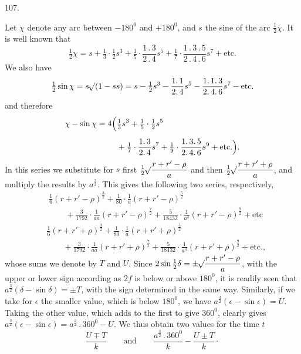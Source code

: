\par{}\medskip
{}
\begin{center}107.\end{center}
Let $\chi$ denote any arc between $-180^0$ and $+180^0$, and $s$ the sine of the arc $\tfrac12\chi$. It is well known that
\[
\tfrac12\chi=s+\tfrac13\cdot\tfrac12s^3+\tfrac15\cdot\frac{1\mathpunct{.}3}{2\mathpunct{.}4}s^5+\tfrac17\cdot\frac{1\mathpunct{.}3\mathpunct{.}5}{2\mathpunct{.}4\mathpunct{.}6}s^7+\text{etc.}
\]
\noindent We also have
\[
\tfrac12\sin\chi=s\mathord{{}^{}\!\surd}(1-ss)=s-\tfrac12s^3-\frac{1\mathpunct{.}1}{2\mathpunct{.}4}s^5-\frac{1\mathpunct{.}1\mathpunct{.}3}{2\mathpunct{.}4\mathpunct{.}6}s^7-\text{etc.}
\]
\noindent and therefore
\[
\begin{aligned}
\chi-\sin\chi=4\Bigl(&\tfrac13s^3+\tfrac15\cdot\tfrac12s^5\\[.5em]
&+\tfrac17\cdot\frac{1\mathpunct{.}3}{2\mathpunct{.}4}s^7+\tfrac19\cdot\frac{1\mathpunct{.}3\mathpunct{.}5}{2\mathpunct{.}4\mathpunct{.}6}s^9+\text{etc.}\Bigr).
\end{aligned}
\]
\noindent In this series we substitute for $s$ first $\tfrac12\mathord{{}^{}\!\surd}\dfrac{r+r'-\rho}{a}$ and then $\tfrac12\mathord{{}^{}\!\surd}\dfrac{r+r'+\rho}{a}$, and multiply the results by $a^{\frac32}$. This gives the following two series, respectively,
\[
\begin{aligned}
&\tfrac16(r+r'-\rho)^{\frac32}+\tfrac1{80}\cdot\frac1a(r+r'-\rho)^{\frac52}\\[.5em]
&\qquad+\tfrac3{1792}\cdot\frac1{aa}(r+r'-\rho)^{\frac72}+\tfrac5{18432}\cdot\frac1{a^3}(r+r'-\rho)^{\frac92}+\text{etc}
\end{aligned}
\]
\[
\begin{aligned}
&\tfrac16(r+r'+\rho)^{\frac32}+\tfrac1{80}\cdot\frac1a(r+r'+\rho)^{\frac52}\\[.5em]
&\qquad+\tfrac3{1792}\cdot\frac1{aa}(r+r'+\rho)^{\frac72}+\tfrac5{18432}\cdot\frac1{a^3}(r+r'+\rho)^{\frac92}+\text{etc.,}
\end{aligned}
\]
\noindent whose sums we denote by $T$ and $U$. Since $2\sin\tfrac12\delta=\pm\mathord{{}^{}\!\surd}\dfrac{r+r'-\rho}{a}$, with the upper or lower sign according as $2f$ is below or above $180^0$, it is readily seen that $a^{\frac32}(\delta-\sin\delta)=\pm T$, with the sign determined in the same way. Similarly, if we take for $\epsilon$ the smaller value, which is below $180^0$, we have $a^{\frac32}(\epsilon-\sin\epsilon)=U$. Taking the other value, which adds to the first to give $360^0$, clearly gives $a^{\frac32}(\epsilon-\sin\epsilon)=a^{\frac32}\mathpunct{.}360^0-U$. We thus obtain two values for the time $t$
\[
\frac{U\mp T}{k}\qquad\text{and}\qquad\frac{a^{\frac32}\mathpunct{.}360^0}{k}-\frac{U\pm T}{k}\mathpunct{\cdot}
\]
